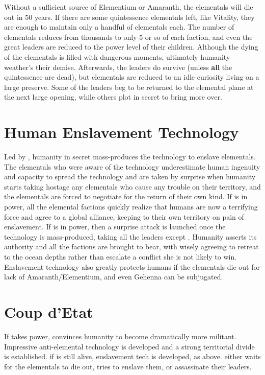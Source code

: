 \documentclass[green]{elementals}
\begin{document}
Without a sufficient source of Elementium or Amaranth, the elementals will die out in 50 years. If there are some quintessence elementals left, like Vitality, they are enough to maintain only a handful of elementals each. The number of elementals reduces from thousands to only 5 or so of each faction, and even the great leaders are reduced to the power level of their children. Although the dying of the elementals is filled with dangerous moments, ultimately humanity weather's their demise. Afterwards, the leaders do survive (unless \textbf{all} the quintessence are dead), but elementals are reduced to an idle curiosity living on a large preserve. Some of the leaders beg to be returned to the elemental plane at the next large opening, while others plot in secret to bring more over.

\section{Human Enslavement Technology}

Led by \cMS{\intro}, humanity in secret mass-produces the technology to enslave elementals. The elementals who were aware of the technology underestimate human ingenuity and capacity to spread the technology and are taken by surprise when humanity starts taking hostage any elementals who cause any trouble on their territory, and the elementals are forced to negotiate for the return of their own kind. If \cLeader{\intro} is in power, all the elemental factions quickly realize that humans are now a terrifying force and agree to a global alliance, keeping to their own territory on pain of enslavement. If \cDema{\intro} is in power, then a surprise attack is launched once the technology is mass-produced, taking all the leaders except \cWaterQueen{}. Humanity asserts its authority and all the factions are brought to bear, with \cWaterQueen{} wisely agreeing to retreat to the ocean depths rather than escalate a conflict she is not likely to win. Enslavement technology also greatly protects humans if the elementals die out for lack of Amaranth/Elementium, and even Gehenna can be subjugated.

\section{Coup d'Etat}

If \cDema{\intro} takes power, \cDema{\they} convinces humanity to become dramatically more militant. Impressive anti-elemental technology is developed and a strong territorial divide is established. if \cMS{\intro} is still alive, enslavement tech is developed, as above. \cDema{} either waits for the elementals to die out, tries to enslave them, or assassinate their leaders.
\end{document}
